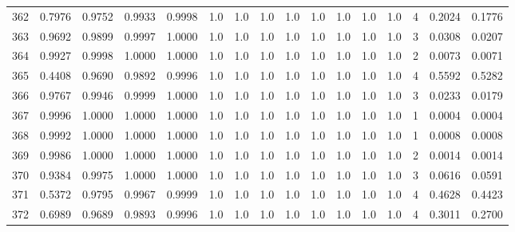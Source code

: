 \begin{tabular}{lrrrrrrrrrrrrrrr}
362 &      0.7976 &  0.9752 &  0.9933 &  0.9998 &     1.0 &     1.0 &     1.0 &     1.0 &     1.0 &     1.0 &      1.0 &        1.0 &      4 &                    0.2024 &                     0.1776 \\
363 &      0.9692 &  0.9899 &  0.9997 &  1.0000 &     1.0 &     1.0 &     1.0 &     1.0 &     1.0 &     1.0 &      1.0 &        1.0 &      3 &                    0.0308 &                     0.0207 \\
364 &      0.9927 &  0.9998 &  1.0000 &  1.0000 &     1.0 &     1.0 &     1.0 &     1.0 &     1.0 &     1.0 &      1.0 &        1.0 &      2 &                    0.0073 &                     0.0071 \\
365 &      0.4408 &  0.9690 &  0.9892 &  0.9996 &     1.0 &     1.0 &     1.0 &     1.0 &     1.0 &     1.0 &      1.0 &        1.0 &      4 &                    0.5592 &                     0.5282 \\
366 &      0.9767 &  0.9946 &  0.9999 &  1.0000 &     1.0 &     1.0 &     1.0 &     1.0 &     1.0 &     1.0 &      1.0 &        1.0 &      3 &                    0.0233 &                     0.0179 \\
367 &      0.9996 &  1.0000 &  1.0000 &  1.0000 &     1.0 &     1.0 &     1.0 &     1.0 &     1.0 &     1.0 &      1.0 &        1.0 &      1 &                    0.0004 &                     0.0004 \\
368 &      0.9992 &  1.0000 &  1.0000 &  1.0000 &     1.0 &     1.0 &     1.0 &     1.0 &     1.0 &     1.0 &      1.0 &        1.0 &      1 &                    0.0008 &                     0.0008 \\
369 &      0.9986 &  1.0000 &  1.0000 &  1.0000 &     1.0 &     1.0 &     1.0 &     1.0 &     1.0 &     1.0 &      1.0 &        1.0 &      2 &                    0.0014 &                     0.0014 \\
370 &      0.9384 &  0.9975 &  1.0000 &  1.0000 &     1.0 &     1.0 &     1.0 &     1.0 &     1.0 &     1.0 &      1.0 &        1.0 &      3 &                    0.0616 &                     0.0591 \\
371 &      0.5372 &  0.9795 &  0.9967 &  0.9999 &     1.0 &     1.0 &     1.0 &     1.0 &     1.0 &     1.0 &      1.0 &        1.0 &      4 &                    0.4628 &                     0.4423 \\
372 &      0.6989 &  0.9689 &  0.9893 &  0.9996 &     1.0 &     1.0 &     1.0 &     1.0 &     1.0 &     1.0 &      1.0 &        1.0 &      4 &                    0.3011 &                     0.2700 \\

\end{tabular}
